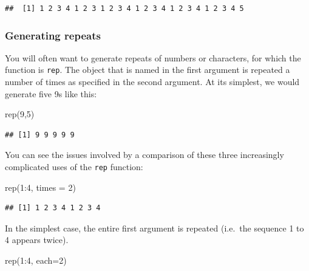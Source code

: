 \documentclass[
]{book}
\newenvironment{Shaded}{\begin{snugshade}}{\end{snugshade}}
\newcommand{\AttributeTok}[1]{\textcolor[rgb]{0.77,0.63,0.00}{#1}}
\newcommand{\DecValTok}[1]{\textcolor[rgb]{0.00,0.00,0.81}{#1}}
\newcommand{\FunctionTok}[1]{\textcolor[rgb]{0.00,0.00,0.00}{#1}}
\newcommand{\NormalTok}[1]{#1}
\newcommand{\SpecialCharTok}[1]{\textcolor[rgb]{0.00,0.00,0.00}{#1}}
\begin{document}
\begin{verbatim}
##  [1] 1 2 3 4 1 2 3 1 2 3 4 1 2 3 4 1 2 3 4 1 2 3 4 5
\end{verbatim}

\hypertarget{generating-repeats}{%
\subsubsection{Generating repeats}\label{generating-repeats}}

You will often want to generate repeats of numbers or characters, for which the function is \texttt{rep}. The object that is named in the first argument is repeated a number of times as specified in the second argument. At its simplest, we would generate five 9s like this:

\begin{Shaded}
\begin{Highlighting}[]
\FunctionTok{rep}\NormalTok{(}\DecValTok{9}\NormalTok{,}\DecValTok{5}\NormalTok{)}
\end{Highlighting}
\end{Shaded}

\begin{verbatim}
## [1] 9 9 9 9 9
\end{verbatim}

You can see the issues involved by a comparison of these three increasingly complicated uses of the \texttt{rep} function:

\begin{Shaded}
\begin{Highlighting}[]
\FunctionTok{rep}\NormalTok{(}\DecValTok{1}\SpecialCharTok{:}\DecValTok{4}\NormalTok{, }\AttributeTok{times =} \DecValTok{2}\NormalTok{)}
\end{Highlighting}
\end{Shaded}

\begin{verbatim}
## [1] 1 2 3 4 1 2 3 4
\end{verbatim}

In the simplest case, the entire first argument is repeated (i.e.~the sequence 1 to 4 appears twice).

\begin{Shaded}
\begin{Highlighting}[]
\FunctionTok{rep}\NormalTok{(}\DecValTok{1}\SpecialCharTok{:}\DecValTok{4}\NormalTok{, }\AttributeTok{each=}\DecValTok{2}\NormalTok{)}
\end{Highlighting}
\end{Shaded}
\end{document}
